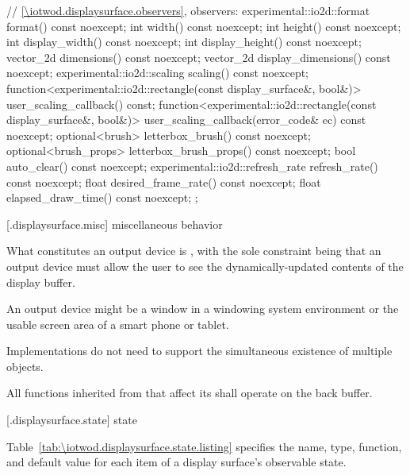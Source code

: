 \begin{codeblock}
{{    // \ref{\iotwod.displaysurface.observers}, observers:
    experimental::io2d::format format() const noexcept;
    int width() const noexcept;
    int height() const noexcept;
    int display_width() const noexcept;
    int display_height() const noexcept;
    vector_2d dimensions() const noexcept;
    vector_2d display_dimensions() const noexcept;
    experimental::io2d::scaling scaling() const noexcept;
    function<experimental::io2d::rectangle(const display_surface&,
      bool&)> user_scaling_callback() const;
    function<experimental::io2d::rectangle(const display_surface&,
      bool&)> user_scaling_callback(error_code& ec) const noexcept;
    optional<brush> letterbox_brush() const noexcept;
    optional<brush_props> letterbox_brush_props() const noexcept;
    bool auto_clear() const noexcept;
    experimental::io2d::refresh_rate refresh_rate() const noexcept;
    float desired_frame_rate() const noexcept;
    float elapsed_draw_time() const noexcept;
  };
}
\end{codeblock}

 [\iotwod.displaysurface.misc] { miscellaneous behavior}

\pnum
What constitutes an output device is , with the sole constraint being that an output device must allow the user to see the dynamically-updated contents of the display buffer.
\begin{example}
An output device might be a window in a windowing system environment or the usable screen area of a smart phone or tablet.
\end{example}

\pnum
Implementations do not need to support the simultaneous existence of multiple  objects.

\pnum
All functions inherited from  that affect its \underlyingsurface shall operate on the back buffer.

 [\iotwod.displaysurface.state] { state}

\pnum
Table~\ref{tab:\iotwod.displaysurface.state.listing} specifies the name, type, function, and default value for each item of a display surface's observable state.

